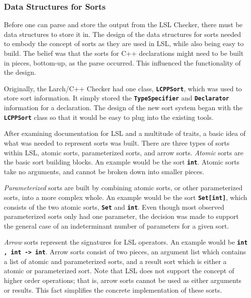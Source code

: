 \documentclass[12pt]{article} %
\newcommand{\reserved}[1]{\textbf{\texttt{#1}}} %
\begin{document}
\subsubsection{Data Structures for Sorts}
Before one can parse and store the output from the LSL Checker, there
must be data structures to store it in. The design of the data
structures for sorts needed to embody the concept of sorts as they are
used in LSL, while also being easy to build. The belief was that the
sorts for C++ declarations might need to be built in pieces,
bottom-up, as the parse occurred. This influenced the functionality of
the design.

Originally, the Larch/C++ Checker had one class, \reserved{LCPPSort},
which was used to store sort information. It simply stored the
\reserved{TypeSpecifier} and \reserved{Declarator} information for a
declaration. The design of the new sort system began with the
\reserved{LCPPSort} class so that it would be easy to plug into the
existing tools.

After examining documentation for LSL and a multitude of traits, a
basic idea of what was needed to represent sorts was built. There are
three types of sorts within LSL, atomic sorts, parameterized sorts,
and arrow sorts. \emph{Atomic} sorts are the basic sort building
blocks. An example would be the sort \reserved{int}. Atomic sorts take
no arguments, and cannot be broken down into smaller
pieces. 


\emph{Parameterized} sorts are built by combining atomic sorts, or
other parameterized sorts, into a more complex whole. An example would
be the sort
\reserved{Set[int]}, which consists of the two atomic sorts,
\reserved{Set} and \reserved{int}. Even though most observed
parameterized sorts only had one parameter, the decision was made to
support the general case of an indeterminant number of parameters for a
given sort.

\emph{Arrow} sorts represent the signatures for LSL operators. An
example would be \reserved{int , int -> int}. Arrow sorts consist of
two pieces, an argument list which contains a list of atomic and
parameterized sorts, and a result sort which is either a atomic or
parameterized sort. Note that LSL does not support the concept of
higher order operations; that is, arrow sorts cannot be used as either
arguments or results. This fact simplifies the concrete implementation
of these sorts.
\end{document}
